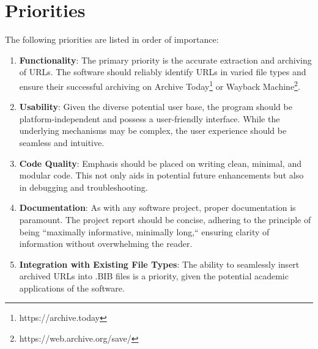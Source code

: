 \section{Priorities}
The following priorities are listed in order of importance:
\begin{enumerate}
    \item \textbf{Functionality}: The primary priority is the accurate extraction and archiving of URLs. The software should reliably identify URLs in varied file types and ensure their successful archiving on Archive Today\footnote{https://archive.today} or Wayback Machine\footnote{https://web.archive.org/save/}.
    \item \textbf{Usability}: Given the diverse potential user base, the program should be platform-independent and possess a user-friendly interface. While the underlying mechanisms may be complex, the user experience should be seamless and intuitive.
    \item \textbf{Code Quality}: Emphasis should be placed on writing clean, minimal, and modular code. This not only aids in potential future enhancements but also in debugging and troubleshooting.
    \item \textbf{Documentation}: As with any software project, proper documentation is paramount. The project report should be concise, adhering to the principle of being ``maximally informative, minimally long,`` ensuring clarity of information without overwhelming the reader.
    \item \textbf{Integration with Existing File Types}: The ability to seamlessly insert archived URLs into .BIB files is a priority, given the potential academic applications of the software.
\end{enumerate}